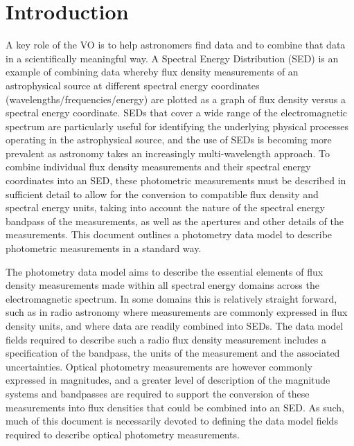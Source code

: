 \documentclass[11pt,a4paper]{ivoa}
\begin{document}
\section{Introduction}
A key role of the VO is to help astronomers find data and to
combine that data in a scientifically meaningful way. A Spectral
Energy Distribution (SED) is an example of combining data whereby
flux density measurements of an astrophysical source at different
spectral energy coordinates (wavelengths/frequencies/energy)
\citep{doi:10.1146/annurev.astro.41.082801.100251,longo,connell,brujine}
are plotted as a
graph of flux density versus a spectral energy coordinate. SEDs that
cover a wide range of the electromagnetic spectrum are particularly
useful for identifying the underlying physical processes operating
in the astrophysical source, and the use of SEDs is becoming more
prevalent as astronomy takes an increasingly multi-wavelength
approach. To combine individual flux density measurements and their
spectral energy coordinates into an SED, these photometric measurements
must be described in sufficient detail to allow for the conversion to
compatible flux density and spectral energy units,  taking into
account the nature of the spectral energy bandpass of the measurements,
as well as the apertures and other details of  the measurements.
This document outlines a photometry data model to describe photometric
measurements in a standard way.

The photometry data model aims to describe the essential elements
of flux density measurements made within all spectral energy domains
across the electromagnetic spectrum. In some domains this is
relatively straight forward, such as in radio astronomy where
measurements are commonly expressed in flux density units, and
where data are readily combined into SEDs. The data model fields
required to describe such a radio flux density measurement includes
a specification of the bandpass, the units of the measurement and
the associated uncertainties. Optical photometry measurements are
however commonly expressed in magnitudes, and a greater level of
description of the magnitude systems and bandpasses are required
to support the conversion of these measurements into flux densities
that could be combined into an SED. As such, much of this document
is necessarily devoted to defining the data model fields required
to describe optical photometry measurements.
\end{document}
